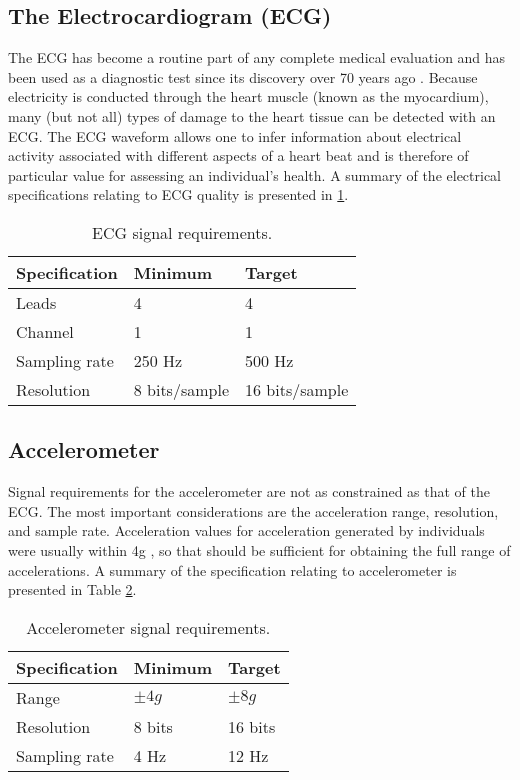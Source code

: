 \subsection{The Electrocardiogram (ECG)}
The ECG has become a routine part of any complete medical evaluation and has been used as a diagnostic 
test since its discovery over 70 years ago \cite{ecg}. Because electricity is conducted through 
the heart muscle (known as the myocardium), many (but not all) types of damage 
to the heart tissue can be detected with an ECG. The ECG waveform allows one to 
infer information about electrical activity associated with different aspects of a heart 
beat and is therefore of particular value for assessing an individual's  health. A summary of the electrical specifications relating to ECG quality is presented in \ref{table:ecg}.

\begin{table}
  \centering
  \begin{tabular}{|l|l|l|}
    \hline
    Specification & Minimum & Target \\
    \hline
    Leads & 4 & 4 \\
    Channel & 1 & 1 \\
    Sampling rate & 250 Hz & 500 Hz \\
    Resolution & 8 bits/sample & 16 bits/sample \\
    \hline
  \end{tabular}
  \caption{ECG signal requirements.}
  \label{table:ecg}
\end{table}

\subsection{Accelerometer}
Signal requirements for the accelerometer are not as constrained as that of the ECG. The most important considerations are the acceleration range, resolution, and sample rate. Acceleration values for acceleration generated by individuals were usually within 4g \cite{wearable_ecg}, so that should be sufficient for obtaining the full range of accelerations. A summary of the specification relating to accelerometer is presented in Table \ref{table:acc}.
\begin{table}[h]
	\centering
	\begin{tabular}{|l |l|l|}
		\hline
		Specification & Minimum & Target \\
		\hline
		Range & $\pm 4g$ & $\pm 8g$ \\
		Resolution & 8 bits & 16 bits\\
		Sampling rate & 4 Hz & 12 Hz \\
		\hline
	\end{tabular}
	\caption{Accelerometer signal requirements.}
	\label{table:acc}
\end{table}

